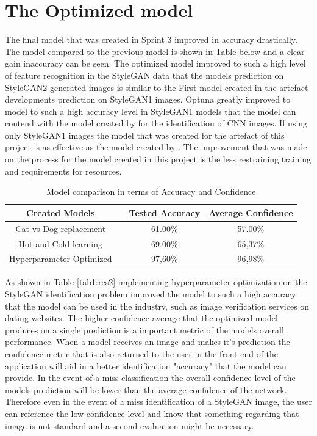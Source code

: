 \section{The Optimized model}

The final model that was created in Sprint 3 improved in accuracy drastically. The model compared to the previous model is shown in Table below and a clear gain inaccuracy can be seen. The optimized model improved to such a high level of feature recognition in the StyleGAN data that the models prediction on StyleGAN2 generated images is similar to the First model created in the artefact developments prediction on StyleGAN1 images. Optuna greatly improved to model to such a high accuracy level in StyleGAN1 models that the model can contend with the model created by \cite{Wang} for the identification of CNN images. If using only StyleGAN1 images the model that was created for the artefact of this project is as effective as the model created by \cite{Wang}. The improvement that was made on the process for the model created in this project is the less restraining training and requirements for resources.

\begin{table}[!htbp!]%
\caption{Model comparison in terms of Accuracy and Confidence}
\label{tabl:res2}
\centering
\large
\begin{tabular}{cccc}
\hline
Created Models & & Tested Accuracy  & Average Confidence\\ 
\hline
Cat-vs-Dog replacement & & 61.00\% & 57.00\%\\
Hot and Cold learning & & 69.00\% & 65,37\%\\
Hyperparameter Optimized & & 97,60\% & 96,98\%\\
\hline
\end{tabular}

\end{table} 


As shown in Table \ref{tab1:res2} implementing hyperparameter optimization on the StyleGAN identification problem improved the model to such a high accuracy that the model can be used in the industry, such as image verification services on dating websites. The higher confidence average that the optimized model produces on a single prediction is a important metric of the models overall performance. When a model receives an image and makes it's prediction the confidence metric that is also returned to the user in the front-end of the application will aid in a better identification "accuracy" that the model can provide. In the event of a miss classification the overall confidence level of the models prediction will be lower than the average confidence of the network. Therefore even in the event of a miss identification of a StyleGAN image, the user can reference the low confidence level and know that something regarding that image is not standard and a second evaluation might be necessary.

